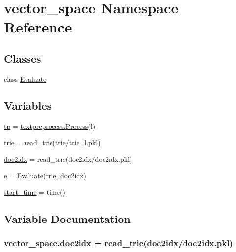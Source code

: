 \hypertarget{namespacevector__space}{}\section{vector\+\_\+space Namespace Reference}
\label{namespacevector__space}
\subsection*{Classes}
\begin{DoxyCompactItemize}
\item 
class \hyperlink{classvector__space_1_1_evaluate}{Evaluate}
\end{DoxyCompactItemize}
\subsection*{Variables}
\begin{DoxyCompactItemize}
\item 
\hyperlink{namespacevector__space_a201d00bd1260755d150c26381d00f6a2}{tp} = \hyperlink{classtextpreprocess_1_1_process}{textpreprocess.\+Process}(\textquotesingle{}l\textquotesingle{})
\item 
\hyperlink{namespacevector__space_a1571be42d00e6bcbf542bbe0ff9778b8}{trie} = read\+\_\+trie(\textquotesingle{}trie/trie\+\_\+l.\+pkl\textquotesingle{})
\item 
\hyperlink{namespacevector__space_acbe3eddf1b00159b161caa1abb61be24}{doc2idx} = read\+\_\+trie(\textquotesingle{}doc2idx/doc2idx.\+pkl\textquotesingle{})
\item 
\hyperlink{namespacevector__space_ad8aab3e65ae6d924d782f7e85f5e4e1d}{e} = \hyperlink{classvector__space_1_1_evaluate}{Evaluate}(\hyperlink{namespacevector__space_a1571be42d00e6bcbf542bbe0ff9778b8}{trie}, \hyperlink{namespacevector__space_acbe3eddf1b00159b161caa1abb61be24}{doc2idx})
\item 
\hyperlink{namespacevector__space_acbfb0c4622de3db60780ff08b5b531e2}{start\+\_\+time} = time()
\end{DoxyCompactItemize}


\subsection{Variable Documentation}
\subsubsection[{\texorpdfstring{doc2idx}{doc2idx}}]{\setlength{\rightskip}{0pt plus 5cm}vector\+\_\+space.\+doc2idx = read\+\_\+trie(\textquotesingle{}doc2idx/doc2idx.\+pkl\textquotesingle{})}\hypertarget{namespacevector__space_acbe3eddf1b00159b161caa1abb61be24}{}\label{namespacevector__space_acbe3eddf1b00159b161caa1abb61be24}
